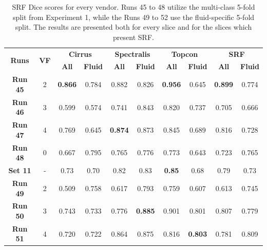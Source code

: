 \begin{table}[!ht]
	\caption{SRF Dice scores for every vendor. Runs 45 to 48 utilize the multi-class 5-fold split from Experiment 1, while the Runs 49 to 52 use the fluid-specific 5-fold split. The results are presented both for every slice and for the slices which present SRF.}
	\centering
	\begin{tabular}{|c|c|cc|cc|cc|cc|}
		\hline
		\multirow{2}{*}{\textbf{Runs}} &
		\multirow{2}{*}{\textbf{VF}} & 
		\multicolumn{2}{c|}{\textbf{Cirrus}} & 
		\multicolumn{2}{c|}{\textbf{Spectralis}} & 
		\multicolumn{2}{c|}{\textbf{Topcon}} & 
		\multicolumn{2}{c|}{\textbf{SRF}} \\ 
		\cline{3-10} & &
		\multicolumn{1}{c}{\textbf{All}} &  
		\textbf{\textbf{Fluid}} & 
		\multicolumn{1}{c}{\textbf{All}} &  
		\textbf{\textbf{Fluid}} & 
		\multicolumn{1}{c}{\textbf{All}} & 
		\textbf{\textbf{Fluid}} & 
		\multicolumn{1}{c}{\textbf{All}} & 
		\textbf{\textbf{Fluid}}\\ 
		
		\hline
		
		\textbf{Run 45} & 2 & \textbf{0.866} & 0.784 & 0.882 & 0.826 & \textbf{0.956} & 0.645 & \textbf{0.899} & 0.774 \\
		
		\textbf{Run 46} & 3 & 0.599 & 0.574 & 0.741 & 0.843 & 0.820 & 0.737 & 0.705 & 0.666 \\
		
		\textbf{Run 47} & 4 & 0.769 & 0.645 & \textbf{0.874} & 0.873 & 0.845 & 0.689 & 0.816 & 0.728 \\
		
		\textbf{Run 48} & 0 & 0.667 & 0.795 & 0.765 & 0.776 & 0.773 & 0.643 & 0.723 & 0.765 \\
		
		\hline
		
		\textbf{Set 11} & - & 0.73 & 0.70 & 0.82 & 0.83 & \textbf{0.85} & 0.68 & 0.79 & 0.73 \\
		
		\hline		
		\hline
		
		\textbf{Run 49} & 2 & 0.509 & 0.758 & 0.617 & 0.793 & 0.759 & 0.607 & 0.613 & 0.745 \\
		
		\textbf{Run 50} & 3 & 0.743 & 0.733 & 0.776 & \textbf{0.885} & 0.901 & 0.801 & 0.807 & 0.779 \\
		
		\textbf{Run 51} & 4 & 0.720 & 0.722 & 0.864 & 0.875 & 0.816 & \textbf{0.803} & 0.781 & 0.809 \\
		

\end{tabular}
\end{table}
